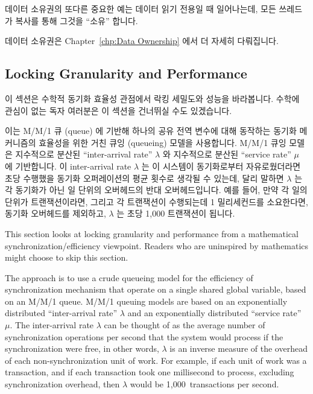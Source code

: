 데이터 소유권의 또다른 중요한 예는 데이터 읽기 전용일 때 일어나는데, 모든
쓰레드가 복사를 통해 그것을 ``소유'' 합니다.

데이터 소유권은 Chapter~\ref{chp:Data Ownership} 에서 더 자세히 다뤄집니다.

\subsection{Locking Granularity and Performance}
\label{sec:SMPdesign:Locking Granularity and Performance}

이 섹션은 수학적 동기화 효율성 관점에서 락킹 세밀도와 성능을 바라봅니다.
수학에 관심이 없는 독자 여러분은 이 섹션을 건너뛰실 수도 있겠습니다.

이는 M/M/1 큐 (queue) 에 기반해 하나의 공유 전역 변수에 대해 동작하는 동기화
메커니즘의 효율성을 위한 거친 큐잉 (queueing) 모델을 사용합니다.
M/M/1 큐잉 모델은 지수적으로 분산된 ``inter-arrival rate'' $\lambda$ 와
지수적으로 분산된 ``service rate'' $\mu$ 에 기반합니다.
이 inter-arrival rate $\lambda$ 는 이 시스템이 동기화로부터 자유로웠더라면 초당
수행했을 동기화 오퍼레이션의 평균 횟수로 생각될 수 있는데, 달리 말하면
$\lambda$ 는 각 동기화가 아닌 일 단위의 오버헤드의 반대 오버헤드입니다.
예를 들어, 만약 각 일의 단위가 트랜잭션이라면, 그리고 각 트랜잭션이 수행되는데
1 밀리세컨드를 소요한다면, 동기화 오버헤드를 제외하고, $\lambda$ 는 초당 1,000
트랜잭션이 됩니다.

\iffalse

This section looks at locking granularity and performance from
a mathematical synchronization\-/efficiency viewpoint.
Readers who are uninspired by mathematics might choose to skip
this section.

The approach is to use a crude queueing model for the efficiency of
synchronization mechanism that operate on a single shared global
variable, based on an M/M/1 queue.
M/M/1 queuing models are based on an exponentially distributed
``inter-arrival rate'' $\lambda$ and an exponentially distributed
``service rate'' $\mu$.
The inter-arrival rate $\lambda$ can be thought of as the average
number of synchronization operations per second that the system
would process if the synchronization were free, in other words,
$\lambda$ is an inverse measure of the overhead of each non-synchronization
unit of work.
For example, if each unit of work was a transaction, and if each transaction
took one millisecond to process, excluding synchronization overhead,
then $\lambda$ would be 1,000~transactions per second.

